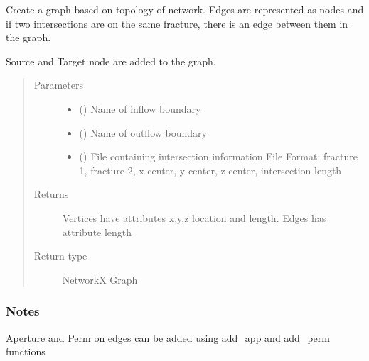 \documentclass[letterpaper,10pt,english]{sphinxmanual}
\begin{document}

\begin{fulllineitems}
\label{\detokenize{pydfnworks:pydfnworks.dfnGraph.dfn2graph.create_intersection_graph}}
Create a graph based on topology of network.
Edges are represented as nodes and if two intersections
are on the same fracture, there is an edge between them in the graph.

Source and Target node are added to the graph.
\begin{quote}\begin{description}
\item[{Parameters}] \leavevmode\begin{itemize}
\item {} 
 () \textendash{} Name of inflow boundary

\item {} 
 () \textendash{} Name of outflow boundary

\item {} 
 () \textendash{} File containing intersection information
File Format:
fracture 1, fracture 2, x center, y center, z center, intersection length

\end{itemize}

\item[{Returns}] \leavevmode
{} \textendash{} Vertices have attributes x,y,z location and length. Edges has attribute length

\item[{Return type}] \leavevmode
NetworkX Graph

\end{description}\end{quote}
\subsubsection*{Notes}

Aperture and Perm on edges can be added using add\_app and add\_perm functions

\end{fulllineitems}
\end{document}
